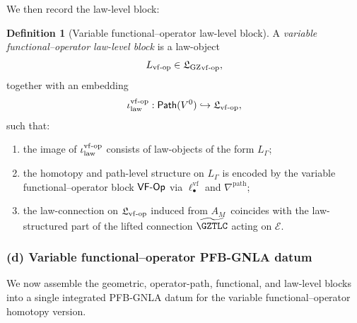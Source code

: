 \documentclass[11pt]{book}
\theoremstyle{plain}
\theoremstyle{definition}
\newtheorem{definition}[theorem]{Definition} \theoremstyle{remark}
\newcommand{\GZLS}{\ensuremath{\mathfrak{L}_{\mathrm{GZ}}}}       \newcommand{\GZLT}{\ensuremath{M_{!w}}}                           \newcommand{\GZLOC}{\ensuremath{A_M}}                             \newcommand{\GZLCurv}{\ensuremath{\mathcal{F}_{\mathrm{law}}}}
\begin{document}
We then record the law-level block:

\begin{definition}[Variable functional--operator law-level block]
A \emph{variable functional--operator law-level block} is a law-object
  \[
     L_{\mathrm{vf\text- op}}
     \in {\GZLS}_{\mathrm{vf\text- op}},
  \]
  together with an embedding
  \[
     \iota_{\mathrm{law}}^{\mathrm{vf\text- op}}:
       \mathsf{Path}(V^0)
       \hookrightarrow
       \mathfrak{L}_{\mathrm{vf\text- op}},
  \]
  such that:
  \begin{enumerate}[label=\roman*)]
    \item the image of $\iota_{\mathrm{law}}^{\mathrm{vf\text- op}}$
          consists of law-objects of the form $L_\Gamma$;
    \item the homotopy and path-level structure on $L_\Gamma$ is
          encoded by the variable functional--operator block
          $\mathsf{VF\text- Op}$ via $\ell_\bullet^{\mathrm{vf}}$ and
          $\nabla^{\mathrm{path}}$;
    \item the law-connection on
          $\mathfrak{L}_{\mathrm{vf\text- op}}$ induced from \GZLOC\
          coincides with the law-structured part of the lifted
          connection $\widetilde{\GZTLC}$ acting on $\mathcal{E}$.
  \end{enumerate}
\end{definition}



\subsubsection*{(d) Variable functional--operator PFB-GNLA datum}

We now assemble the geometric, operator-path, functional, and law-level
blocks into a single integrated PFB-GNLA datum for the variable
functional--operator homotopy version.
\end{document}

